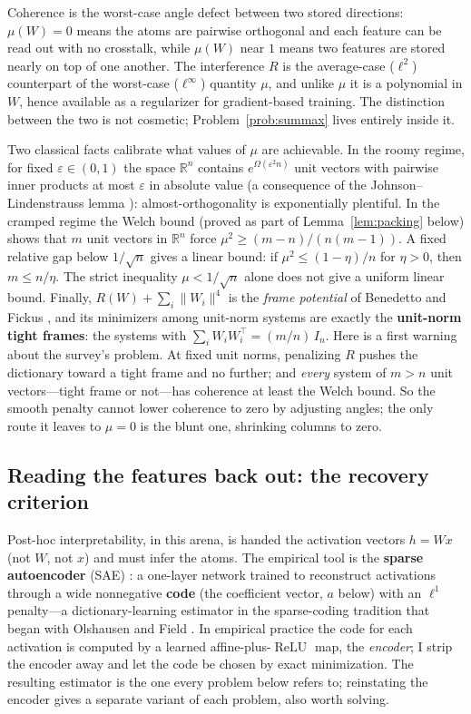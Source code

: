 \documentclass[11pt]{amsart}
\theoremstyle{plain}
\theoremstyle{definition}
\DeclareMathOperator{\relu}{ReLU}
\newcommand{\R}{\mathbb{R}}
\begin{document}
Coherence is the worst-case angle defect between two stored directions: $\mu(W)=0$ means the atoms are pairwise orthogonal and each feature can be read out with no crosstalk, while $\mu(W)$ near $1$ means two features are stored nearly on top of one another. The interference $R$ is the average-case ($\ell^2$) counterpart of the worst-case ($\ell^\infty$) quantity $\mu$, and unlike $\mu$ it is a polynomial in $W$, hence available as a regularizer for gradient-based training. The distinction between the two is not cosmetic; Problem~\ref{prob:summax} lives entirely inside it.

Two classical facts calibrate what values of $\mu$ are achievable. In the roomy regime, for fixed $\varepsilon\in(0,1)$ the space $\R^n$ contains $e^{\Omega(\varepsilon^2 n)}$ unit vectors with pairwise inner products at most $\varepsilon$ in absolute value (a consequence of the Johnson--Lindenstrauss lemma \cite{johnson1984}): almost-orthogonality is exponentially plentiful. In the cramped regime the Welch bound \cite{welch1974} (proved as part of Lemma~\ref{lem:packing} below) shows that $m$ unit vectors in $\R^n$ force $\mu^2 \ge (m-n)/(n(m-1))$. A fixed relative gap below $1/\sqrt n$ gives a linear bound: if $\mu^2\le(1-\eta)/n$ for $\eta>0$, then $m\le n/\eta$. The strict inequality $\mu<1/\sqrt n$ alone does not give a uniform linear bound. Finally, $R(W)+\sum_i \|W_i\|^4$ is the \emph{frame potential} of Benedetto and Fickus \cite{benedetto2003}, and its minimizers among unit-norm systems are exactly the \textbf{unit-norm tight frames}: the systems with $\sum_i W_iW_i^{\top}=(m/n)\,I_n$. Here is a first warning about the survey's problem. At fixed unit norms, penalizing $R$ pushes the dictionary toward a tight frame and no further; and \emph{every} system of $m>n$ unit vectors---tight frame or not---has coherence at least the Welch bound. So the smooth penalty cannot lower coherence to zero by adjusting angles; the only route it leaves to $\mu=0$ is the blunt one, shrinking columns to zero.

\subsection{Reading the features back out: the recovery criterion}\label{sec:recovery}

Post-hoc interpretability, in this arena, is handed the activation vectors $h=Wx$ (not $W$, not $x$) and must infer the atoms. The empirical tool is the \textbf{sparse autoencoder} (SAE) \cite{bricken2023,cunningham2023}: a one-layer network trained to reconstruct activations through a wide nonnegative \textbf{code} (the coefficient vector, $a$ below) with an $\ell^1$ penalty---a dictionary-learning estimator in the sparse-coding tradition that began with Olshausen and Field \cite{olshausen1996}. In empirical practice the code for each activation is computed by a learned affine-plus-$\relu$ map, the \emph{encoder}; I strip the encoder away and let the code be chosen by exact minimization. The resulting estimator is the one every problem below refers to; reinstating the encoder gives a separate variant of each problem, also worth solving.
\end{document}
